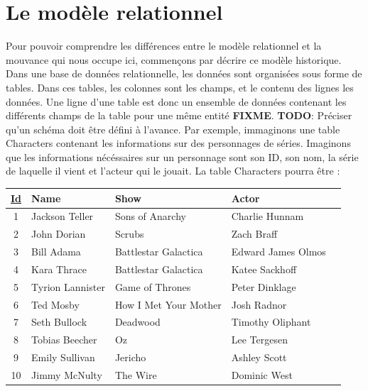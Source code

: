 \documentclass[11pt]{article}
\begin{document}
\section{Le modèle relationnel}
Pour pouvoir comprendre les différences entre le modèle relationnel et la mouvance qui nous occupe ici, commençons par décrire ce modèle historique. \\
Dans une base de données relationnelle, les données sont organisées sous forme de tables. Dans ces tables, les colonnes sont les champs, et le contenu des lignes les données. Une ligne d'une table est donc un ensemble de données contenant les différents champs de la table pour une même entité \textbf{FIXME}. \textbf{TODO}: Préciser qu'un schéma doit être défini à l'avance. Par exemple, immaginons une table Characters contenant les informations sur des personnages de séries. Imaginons que les informations nécéssaires sur un personnage sont son ID, son nom, la série de laquelle il vient et l'acteur qui le jouait. La table Characters pourra être : \\
\begin{center}
  \begin{tabular}{| c | l | l | l | l |}
    \hline
    \textbf{\underline{Id}} & \textbf{Name} & \textbf{Show} & \textbf{Actor} \\
    \hline
    \hline
    1 & Jackson Teller & Sons of Anarchy & Charlie Hunnam \\
    \hline
    2 & John Dorian & Scrubs & Zach Braff  \\
    \hline
    3 & Bill Adama & Battlestar Galactica & Edward James Olmos \\
    \hline
    4 & Kara Thrace & Battlestar Galactica & Katee Sackhoff \\
    \hline
    5 & Tyrion Lannister & Game of Thrones & Peter Dinklage \\
    \hline
    6 & Ted Mosby & How I Met Your Mother & Josh Radnor \\
    \hline
    7 & Seth Bullock & Deadwood & Timothy Oliphant \\
    \hline
    8 & Tobias Beecher & Oz & Lee Tergesen \\
    \hline
    9 & Emily Sullivan & Jericho & Ashley Scott \\
    \hline
    10 & Jimmy McNulty & The Wire & Dominic West \\
    \hline
  \end{tabular}
\end{center} 
\end{document}
